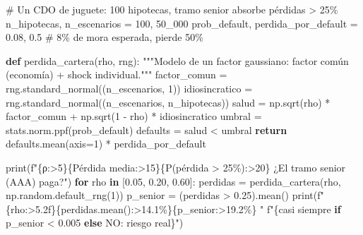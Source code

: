 \documentclass[
  spanish,
  letterpaper,
  DIV=11,
  numbers=noendperiod]{scrreprt}
\newenvironment{Shaded}{\begin{snugshade}}{\end{snugshade}}
\newcommand{\BuiltInTok}[1]{\textcolor[rgb]{0.00,0.23,0.31}{#1}}
\newcommand{\CommentTok}[1]{\textcolor[rgb]{0.37,0.37,0.37}{#1}}
\newcommand{\ControlFlowTok}[1]{\textcolor[rgb]{0.00,0.23,0.31}{\textbf{#1}}}
\newcommand{\DecValTok}[1]{\textcolor[rgb]{0.68,0.00,0.00}{#1}}
\newcommand{\FloatTok}[1]{\textcolor[rgb]{0.68,0.00,0.00}{#1}}
\newcommand{\KeywordTok}[1]{\textcolor[rgb]{0.00,0.23,0.31}{\textbf{#1}}}
\newcommand{\NormalTok}[1]{\textcolor[rgb]{0.00,0.23,0.31}{#1}}
\newcommand{\OperatorTok}[1]{\textcolor[rgb]{0.37,0.37,0.37}{#1}}
\newcommand{\SpecialCharTok}[1]{\textcolor[rgb]{0.37,0.37,0.37}{#1}}
\newcommand{\SpecialStringTok}[1]{\textcolor[rgb]{0.13,0.47,0.30}{#1}}
\newcommand{\StringTok}[1]{\textcolor[rgb]{0.13,0.47,0.30}{#1}}
\begin{document}
\label{cdo-correlacion}
\begin{Shaded}
\begin{Highlighting}[]
\CommentTok{\# Un CDO de juguete: 100 hipotecas, tramo senior absorbe pérdidas \textgreater{} 25\%}
\NormalTok{n\_hipotecas, n\_escenarios }\OperatorTok{=} \DecValTok{100}\NormalTok{, }\DecValTok{50\_000}
\NormalTok{prob\_default, perdida\_por\_default }\OperatorTok{=} \FloatTok{0.08}\NormalTok{, }\FloatTok{0.5}   \CommentTok{\# 8\% de mora esperada, pierde 50\%}

\KeywordTok{def}\NormalTok{ perdida\_cartera(rho, rng):}
    \CommentTok{"""Modelo de un factor gaussiano: factor común (economía) + shock individual."""}
\NormalTok{    factor\_comun }\OperatorTok{=}\NormalTok{ rng.standard\_normal((n\_escenarios, }\DecValTok{1}\NormalTok{))}
\NormalTok{    idiosincratico }\OperatorTok{=}\NormalTok{ rng.standard\_normal((n\_escenarios, n\_hipotecas))}
\NormalTok{    salud }\OperatorTok{=}\NormalTok{ np.sqrt(rho) }\OperatorTok{*}\NormalTok{ factor\_comun }\OperatorTok{+}\NormalTok{ np.sqrt(}\DecValTok{1} \OperatorTok{{-}}\NormalTok{ rho) }\OperatorTok{*}\NormalTok{ idiosincratico}
\NormalTok{    umbral }\OperatorTok{=}\NormalTok{ stats.norm.ppf(prob\_default)}
\NormalTok{    defaults }\OperatorTok{=}\NormalTok{ salud }\OperatorTok{\textless{}}\NormalTok{ umbral}
    \ControlFlowTok{return}\NormalTok{ defaults.mean(axis}\OperatorTok{=}\DecValTok{1}\NormalTok{) }\OperatorTok{*}\NormalTok{ perdida\_por\_default}

\BuiltInTok{print}\NormalTok{(}\SpecialStringTok{f"}\SpecialCharTok{\{}\StringTok{\textquotesingle{}ρ\textquotesingle{}}\SpecialCharTok{:\textgreater{}5\}\{}\StringTok{\textquotesingle{}Pérdida media\textquotesingle{}}\SpecialCharTok{:\textgreater{}15\}\{}\StringTok{\textquotesingle{}P(pérdida \textgreater{} 25\%)\textquotesingle{}}\SpecialCharTok{:\textgreater{}20\}}\SpecialStringTok{   ¿El tramo senior (AAA) paga?"}\NormalTok{)}
\ControlFlowTok{for}\NormalTok{ rho }\KeywordTok{in}\NormalTok{ [}\FloatTok{0.05}\NormalTok{, }\FloatTok{0.20}\NormalTok{, }\FloatTok{0.60}\NormalTok{]:}
\NormalTok{    perdidas }\OperatorTok{=}\NormalTok{ perdida\_cartera(rho, np.random.default\_rng(}\DecValTok{1}\NormalTok{))}
\NormalTok{    p\_senior }\OperatorTok{=}\NormalTok{ (perdidas }\OperatorTok{\textgreater{}} \FloatTok{0.25}\NormalTok{).mean()}
    \BuiltInTok{print}\NormalTok{(}\SpecialStringTok{f"}\SpecialCharTok{\{}\NormalTok{rho}\SpecialCharTok{:\textgreater{}5.2f\}\{}\NormalTok{perdidas}\SpecialCharTok{.}\NormalTok{mean()}\SpecialCharTok{:\textgreater{}14.1\%\}\{}\NormalTok{p\_senior}\SpecialCharTok{:\textgreater{}19.2\%\}}\SpecialStringTok{   "}
          \SpecialStringTok{f"}\SpecialCharTok{\{}\StringTok{\textquotesingle{}casi siempre\textquotesingle{}} \ControlFlowTok{if}\NormalTok{ p\_senior }\OperatorTok{\textless{}} \FloatTok{0.005} \ControlFlowTok{else} \StringTok{\textquotesingle{}NO: riesgo real\textquotesingle{}}\SpecialCharTok{\}}\SpecialStringTok{"}\NormalTok{)}
\end{Highlighting}
\end{Shaded}
\end{document}
